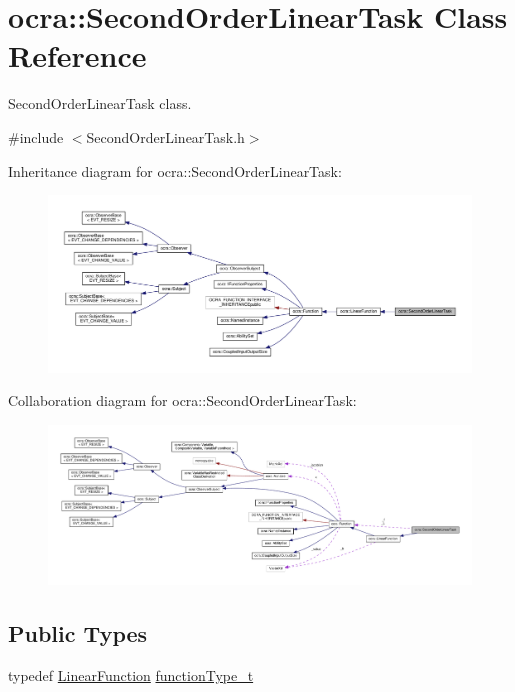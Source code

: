 \hypertarget{classocra_1_1SecondOrderLinearTask}{}\section{ocra\+:\+:Second\+Order\+Linear\+Task Class Reference}
\label{classocra_1_1SecondOrderLinearTask}


Second\+Order\+Linear\+Task class.  




{\ttfamily \#include $<$Second\+Order\+Linear\+Task.\+h$>$}



Inheritance diagram for ocra\+:\+:Second\+Order\+Linear\+Task\+:
\nopagebreak
\begin{figure}[H]
\begin{center}
\leavevmode
\includegraphics[width=350pt]{d6/dec/classocra_1_1SecondOrderLinearTask__inherit__graph}
\end{center}
\end{figure}


Collaboration diagram for ocra\+:\+:Second\+Order\+Linear\+Task\+:
\nopagebreak
\begin{figure}[H]
\begin{center}
\leavevmode
\includegraphics[width=350pt]{de/d45/classocra_1_1SecondOrderLinearTask__coll__graph}
\end{center}
\end{figure}
\subsection*{Public Types}
\begin{DoxyCompactItemize}
\item 
typedef \hyperlink{classocra_1_1LinearFunction}{Linear\+Function} \hyperlink{classocra_1_1SecondOrderLinearTask_aa4843b0b2ad21ecba7decb2be86c6214}{function\+Type\+\_\+t}
\end{DoxyCompactItemize}
